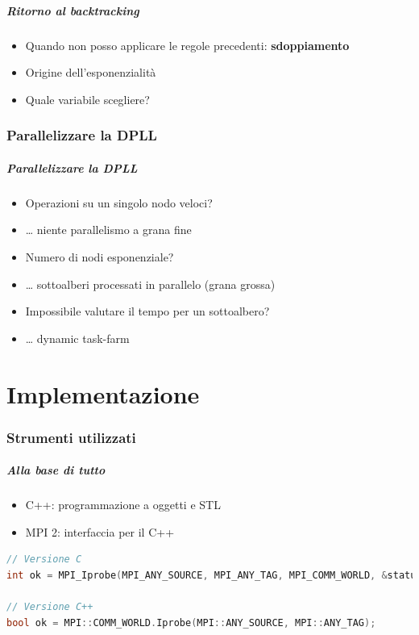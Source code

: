 \documentclass[12pt,xcolor=dvipsnames]{beamer}
\begin{document}
\begin{frame}
	\frametitle{Ritorno al backtracking}
	\begin{itemize}
	 \item Quando non posso applicare le regole precedenti: \textbf{sdoppiamento} \pause
	 \item Origine dell'esponenzialità \pause
     \item Quale variabile scegliere?
	\end{itemize}
\end{frame}

\section{Parallelizzare la DPLL}

\begin{frame}
	\frametitle{Parallelizzare la DPLL}
	\begin{itemize}
	 \item Operazioni su un singolo nodo veloci? \pause
     \item \ldots{} niente parallelismo a grana fine \pause
	 \item Numero di nodi esponenziale? \pause
     \item \ldots{} sottoalberi processati in parallelo (grana grossa) \pause
     \item Impossibile valutare il tempo per un sottoalbero? \pause
     \item \ldots{} dynamic task-farm
	\end{itemize}
\end{frame}

\part{Implementazione}

\begin{frame}
	\partpage
\end{frame}

\section{Strumenti utilizzati}

\begin{frame}[fragile]
	\frametitle{Alla base di tutto}
	\begin{itemize}
	 \item C++: programmazione a oggetti e STL \pause
	 \item MPI 2: interfaccia per il C++
	\end{itemize} \pause
\begin{lstlisting}[language=c++]
// Versione C
int ok = MPI_Iprobe(MPI_ANY_SOURCE, MPI_ANY_TAG, MPI_COMM_WORLD, &status);

// Versione C++
bool ok = MPI::COMM_WORLD.Iprobe(MPI::ANY_SOURCE, MPI::ANY_TAG);
\end{lstlisting}
\end{frame}
\end{document}
